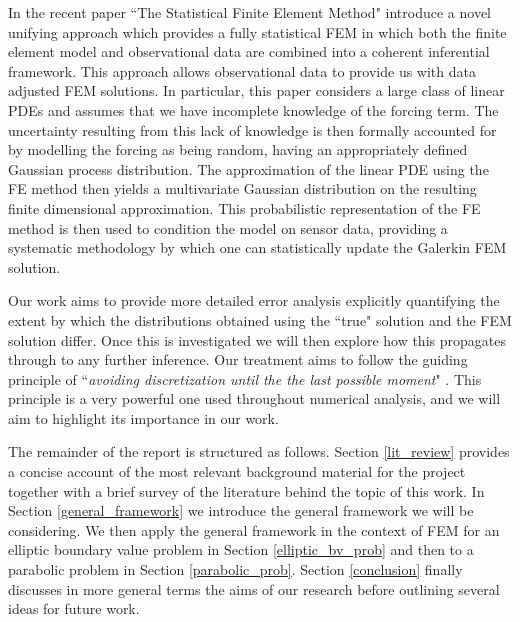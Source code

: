 In the recent paper ``The Statistical Finite Element Method" \textcolor{blue}{\citeauthor{girolami2019statistical}} introduce a novel unifying approach which provides a fully statistical FEM in which both the finite element model and observational data are combined into a coherent inferential framework. This approach allows observational data to provide us with data adjusted FEM solutions. In particular, this paper considers a large class of linear PDEs and assumes that we have incomplete knowledge of the forcing term. The uncertainty resulting from this lack of knowledge is then formally accounted for by modelling the forcing as being random, having an appropriately defined Gaussian process distribution. The approximation of the linear PDE using the FE method then yields a multivariate Gaussian distribution on the resulting finite dimensional approximation. This probabilistic representation of the FE method is then used to condition the model on sensor data, providing a systematic methodology by which one can statistically update the Galerkin FEM solution.

Our work aims to provide more detailed error analysis explicitly quantifying the extent by which the distributions obtained using the ``true" solution and the FEM solution differ. Once this is investigated we will then explore how this propagates through to any further inference. Our treatment aims to follow the guiding principle of ``\textit{avoiding discretization until the the last possible moment}" \textcolor{blue}{\cite{stuart2010inverse}}. This principle is a very powerful one used throughout numerical analysis, and we will aim to highlight its importance in our work.

The remainder of the report is structured as follows. Section \textcolor{blue}{\ref{lit_review}} provides a concise account of the most relevant background material for the project together with a brief survey of the literature behind the topic of this work. In Section \textcolor{blue}{\ref{general_framework}} we introduce the general framework we will be considering. We then apply the general framework in the context of FEM for an elliptic boundary value problem in Section \textcolor{blue}{\ref{elliptic_bv_prob}} and then to a parabolic problem in Section \textcolor{blue}{\ref{parabolic_prob}}. Section \textcolor{blue}{\ref{conclusion}} finally discusses in more general terms the aims of our research before outlining several ideas for future work.
